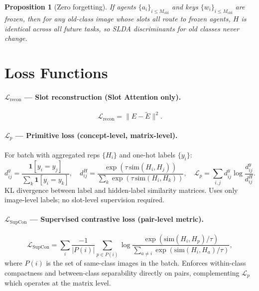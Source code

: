 \documentclass[11pt,a4paper]{article}
\newtheorem{proposition}{Proposition}
\newcommand{\Lcal}{\mathcal{L}}
\begin{document}
\begin{proposition}[Zero forgetting]
If agents $\{a_i\}_{i\leq M_{\mathrm{old}}}$ and keys $\{w_i\}_{i\leq M_{\mathrm{old}}}$ are frozen,
then for any old-class image whose slots all route to frozen agents,
$H$ is identical across all future tasks, so SLDA discriminants for old classes never change.
\end{proposition}

\section{Loss Functions}

\paragraph{$\Lcal_{\mathrm{recon}}$ — Slot reconstruction (Slot Attention only).}
\begin{equation}
  \Lcal_{\mathrm{recon}} = \|E - \tilde{E}\|^2.
\end{equation}

\paragraph{$\Lcal_p$ — Primitive loss (concept-level, matrix-level).}
For batch with aggregated reps $\{H_i\}$ and one-hot labels $\{y_i\}$:
\begin{equation}
  d^y_{ij} = \frac{\mathbf{1}[y_i=y_j]}{\sum_k \mathbf{1}[y_i=y_k]}, \quad
  d^H_{ij} = \frac{\exp(\tau\,\mathrm{sim}(H_i,H_j))}{\sum_k\exp(\tau\,\mathrm{sim}(H_i,H_k))}, \quad
  \Lcal_p = \sum_{i,j} d^y_{ij}\log\frac{d^y_{ij}}{d^H_{ij}}.
\end{equation}
KL divergence between label and hidden-label similarity matrices.
Uses only image-level labels; no slot-level supervision required.

\paragraph{$\Lcal_{\mathrm{SupCon}}$ — Supervised contrastive loss (pair-level metric).}
\begin{equation}
  \Lcal_{\mathrm{SupCon}} = \sum_i \frac{-1}{|P(i)|}\sum_{p\in P(i)}
  \log\frac{\exp(\mathrm{sim}(H_i,H_p)/\tau)}{\sum_{a\neq i}\exp(\mathrm{sim}(H_i,H_a)/\tau)},
\end{equation}
where $P(i)$ is the set of same-class images in the batch.
Enforces within-class compactness and between-class separability directly on pairs,
complementing $\Lcal_p$ which operates at the matrix level.
\end{document}
